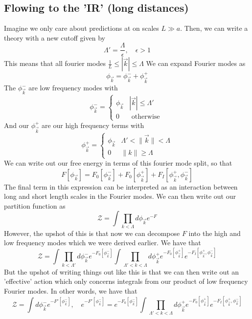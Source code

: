 \documentclass[11pt, oneside]{article}   	%
\begin{document}
\subsection{Flowing to the 'IR' (long distances)} 
Imagine we only care about predictions at on scales
$ L \gg a $. Then, we can write a theory 
with a new cutoff given by 
\[
 \Lambda' = \frac{ \Lambda }{ \epsilon }, \quad \epsilon > 1 
\] This means that all fourier modes $ \frac{1}{ L } \leq | \vec{k} | \leq \Lambda $
We can expand Fourier modes as 
\[
\phi_{ \vec{k} }  = \phi_{\vec{k}}^-  + \phi_{ \vec{k} } ^ + 
\] The $ \phi_{ \vec{k} }^-$ are low frequency modes with 
\[
 \phi_{ \vec{k} }^ -  = \begin{cases}
	 \phi_{ \vec{k} } &  | \vec{k} | \leq \Lambda ' \\
	 0 & \text{ otherwise }
 \end{cases}
\] And our $ \phi_{ \vec{k} } ^ + $ are our high frequency 
terms with 
\[
 \phi_{ \vec{k} }^  +  = \begin{cases}
	 \phi_{ \vec{k}  } & \Lambda ' < \| \vec{k} \| < \Lambda \\
	 0 & \| k \| \geq \Lambda 
 \end{cases}
\]  
We can write out our free energy 
in terms of this fourier mode split, so that 
\[
	F [ \phi _{ \vec{k}  } ] = F_ 0 [ \phi_{ \vec{k} }^ - ]  + F_ 0 [ \phi_{ \vec{k} } ^ +   ] + F_ I [ \phi_{ \vec{k} } ^ + , \phi_{ \vec{k} } ^ - ]  
\]  The final term in this expression can be 
interpreted as an interaction between long and short length scales 
in the Fourier modes. 
We can then write out our partition function as
\[
	\mathcal{ Z} =  \int \prod_{ k <  \Lambda  } d \phi_{ \vec{k}} e^{  - F }  
\] However, the upshot of this is that 
now we can decompose $ F $ into the high and low frequency modes 
which we were derived earlier.
We have that
\[
	\mathcal{ Z } = \int \prod_{ k <  \Lambda ' } d \phi_{ \vec{k} }^- e^{  - F_0 [ \phi _{ \vec{k}} ^-]} \int \prod_{ \Lambda ' <  k < \Lambda} d \phi_{ \vec{k} } ^ + e^{  - F_ 0 [ \phi_{ \vec{k} } ^ +  ] } e^{  - F_ I [ \phi_{ \vec{k} } ^ + , \phi_{ \vec{k} } ^ - ]}
\] But the upshot of writing things out 
like this is that we can then write out an 'effective' 
action which only concerns integrals 
from our product of low frequency Fourier modes. In 
other words, we have that 
\[
	\mathcal{ Z } = \int d \phi_{ \vec{k}  } ^ - e^{  -F' [ \phi_{ \vec{k} } ^ -  ] }, \quad e^{  - F' [ \phi_{ \vec{k} } ^ - ]} = e^{ - F_ 0 [ \phi_{ \vec{k} } ^ -  ] } \int \prod_{ \Lambda ' < k < \Lambda } d \phi_{ \vec{k} } ^ +   e^{  - F_ 0 [ \phi_{ \vec{k} } ^ +  ] } e^{  - F_ I [ \phi_{ \vec{k} } ^ + , \phi_{ \vec{k} } ^ - ]}
\] 
\end{document}
